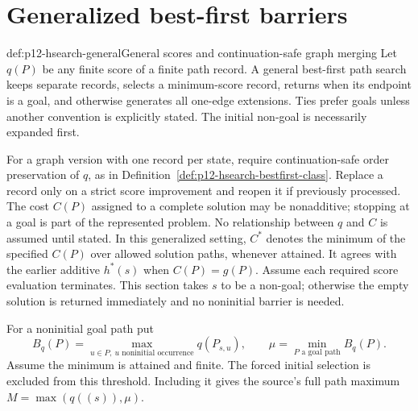 \section{Generalized best-first barriers}
\label{sec:p12-hsearch-generalized}

\begin{hbdefinition}{def:p12-hsearch-general}{General scores and continuation-safe graph merging}
Let \(q(P)\) be any finite score of a finite path record. A general
best-first path search keeps separate records, selects a minimum-score
record, returns when its endpoint is a goal, and otherwise generates
all one-edge extensions. Ties prefer goals unless another convention is
explicitly stated. The initial non-goal is necessarily expanded first.

For a graph version with one record per state, require continuation-safe
order preservation of \(q\), as in
Definition~\ref{def:p12-hsearch-bestfirst-class}. Replace a record only
on a strict score improvement and reopen it if previously processed.
The cost \(C(P)\) assigned to a complete solution may be nonadditive;
stopping at a goal is part of the represented problem. No relationship
between \(q\) and \(C\) is assumed until stated.
In this generalized setting, \(C^*\) denotes the minimum of the
specified \(C(P)\) over allowed solution paths, whenever attained.
It agrees with the earlier additive \(h^*(s)\) when \(C(P)=g(P)\).
Assume each required score evaluation terminates. This section takes
\(s\) to be a non-goal; otherwise the empty solution is returned
immediately and no noninitial barrier is needed.

For a noninitial goal path put
\[
 B_q(P)=\max_{u\in P,\ u\text{ noninitial occurrence}}
                 q(P_{s,u}),\qquad
 \mu=\min_{P\text{ a goal path}}B_q(P).
\]
Assume the minimum is attained and finite. The forced initial selection
is excluded from this threshold. Including it gives the source's full
path maximum \(M=\max(q((s)),\mu)\).
\end{hbdefinition}

